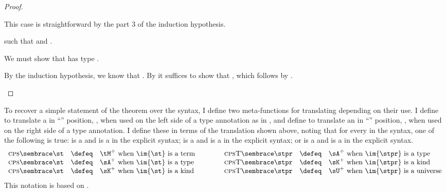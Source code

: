 {\begin{proof}
\begin{proofcases}
\begin{proofcases}
    This case is straightforward by the part 3 of the induction hypothesis.
    \end{proofcases}

  \item {} \im{\styjudg{\slenv}{\se}{\sA}} such that
  \im{\styjudg{\slenv}{\se}{\sB}} and \im{\sA \equiv \sB}.

  We must show that
  \im{\se^\div} has type \im{\sA^\div = \cpspity{\cpsalpha}{\cpsstarty}{\cpsfunty{(\cpsfunty{\sA^+}{\cpsalpha})}{\cpsalpha}}}.

  By the induction hypothesis, we know that \im{\se^\div : {\sB^\div =
      \cpspity{\cpsalpha}{\cpsstarty}{\cpsfunty{(\cpsfunty{\sB^+}{\cpsalpha})}{\cpsalpha}}}}.
  By  it suffices to show that \im{\sA^+ \equiv \sB^+}, which follows
  by . \qedhere
  \end{proofcases}
\end{proof}

To recover a simple statement of the  theorem over the
 syntax, I define two meta-functions for translating
 depending on their use.
I define \im{\cpsterm{\st}} to translate a   in
``'' position, \ie, when used on the left side of a type annotation as in
\im{\st : \stpr}, and define \im{\cpstype{\stpr}} to translate an 
in ``'' position, \ie, when used on the right side of a type annotation.
I define these in terms of the translation shown above, noting that for every
\im{\st : \stpr} in the  syntax, one of the following is true:
\im{\st} is a  \im{\se} and \im{\stpr} is a  \im{\sA} in
the explicit syntax; \im{\st} is a  \im{\sA} and \im{\stpr} is a
 \im{\sK} in the explicit syntax; or \im{\st} is a 
\im{\sK} and \im{\stpr} is a  \im{\sU} in the explicit syntax.
\begin{displaymath}
  \begin{array}{rcl}
    \cpsterm{\st} & \defeq & \se^{\div}\text{ when \im{\st} is a term} \\
    \cpsterm{\st} & \defeq & \sA^{+}\text{ when \im{\st} is a type} \\
    \cpsterm{\st} & \defeq & \sK^{+}\text{ when \im{\st} is a kind} \\
  \end{array}
  \qquad\qquad\!\!\!\!\!
  \begin{array}{rcl}
    \cpstype{\stpr} & \defeq & \sA^{\div}\text{ when \im{\stpr} is a type} \\
    \cpstype{\stpr} & \defeq & \sK^{+}\text{ when \im{\stpr} is a kind} \\
    \cpstype{\stpr} & \defeq & \sU^+\text{ when \im{\stpr} is a universe} \\
  \end{array}
\end{displaymath}
This notation is based on \citet{barthe2002}.

}
